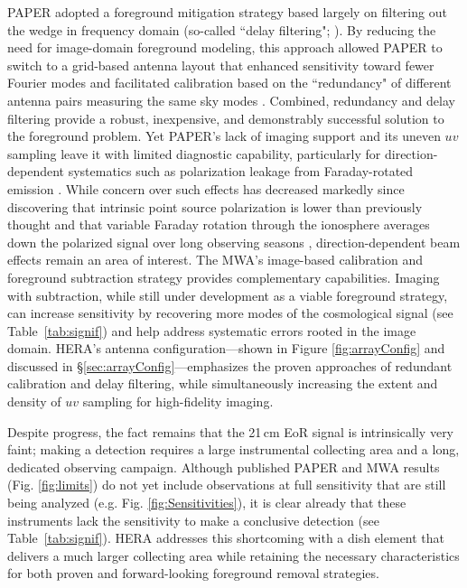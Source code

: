 \documentclass[preprint,11pt]{aastex}
\newcommand{\Mycitep}[1]{\citep{#1}}
\begin{document}
PAPER adopted a foreground mitigation strategy based largely
on filtering out the wedge in frequency domain (so-called ``delay filtering"; \citealt{parsons_et_al2012b}).  
By reducing the need
for image-domain foreground modeling, this approach allowed PAPER to switch to a grid-based antenna layout that
enhanced sensitivity toward fewer Fourier modes and facilitated calibration
based on the ``redundancy" of different antenna pairs measuring the same sky modes \citep{zheng_et_al2014}.
Combined, redundancy and delay filtering provide a robust, inexpensive, and demonstrably successful solution 
to the foreground problem.  
Yet PAPER's lack of imaging support and its uneven $uv$ sampling 
leave it with limited diagnostic capability, particularly for direction-dependent systematics
such as polarization leakage from Faraday-rotated emission \Mycitep{moore_et_al2013}.
While concern over such effects has decreased markedly since discovering that
intrinsic point source polarization is lower than previously thought
\citep{asad_et_al2015} and that variable Faraday rotation through the
ionosphere averages down the polarized signal over long observing seasons
\Mycitep{moore_et_al2016}, direction-dependent beam effects remain an area of interest.
The MWA's image-based calibration and foreground subtraction strategy provides complementary
capabilities. Imaging with subtraction, while still under development as a viable foreground strategy,
can increase sensitivity by recovering more modes of the cosmological signal (see
Table~\ref{tab:signif}) and help address systematic errors rooted
in the image domain.  HERA's antenna configuration---shown in Figure \ref{fig:arrayConfig} and discussed in \S\ref{sec:arrayConfig}---emphasizes
the proven approaches of redundant calibration and delay filtering, while simultaneously
increasing the extent and density of $uv$ sampling for high-fidelity imaging.  

Despite progress, the fact remains that the 21\,cm EoR signal is intrinsically very faint; making a detection requires a
large instrumental collecting area and a long, dedicated observing campaign.
Although published PAPER and MWA results (Fig. \ref{fig:limits}) do not yet include observations 
at full sensitivity that are still being analyzed (e.g. Fig. \ref{fig:Sensitivities}), 
it is clear already that these instruments lack the sensitivity
to make a conclusive detection (see Table~\ref{tab:signif}). 
HERA addresses this shortcoming with a dish element that delivers a much larger collecting area 
while retaining the necessary characteristics for both proven and forward-looking foreground removal strategies.
\end{document}
